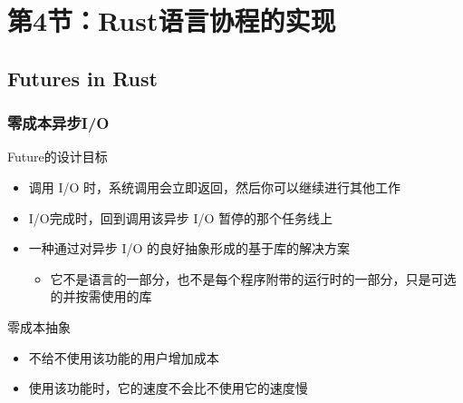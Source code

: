 \section{第4节：Rust语言协程的实现} %
\subsection{Futures in Rust}
% 
% 
\begin{frame}[fragile]
    \frametitle{零成本异步I/O}
% 
% 
% 
Future的设计目标

    \begin{itemize}
        \item 调用 I/O 时，系统调用会立即返回，然后你可以继续进行其他工作
        \item I/O完成时，回到调用该异步 I/O 暂停的那个任务线上
        \item {\color{red}一种通过对异步 I/O 的良好抽象形成的基于库的解决方案}
    	\begin{itemize}
    	    \item 它不是语言的一部分，也不是每个程序附带的运行时的一部分，只是可选的并按需使用的库
    	\end{itemize}
    \end{itemize}

{\color{red}零成本抽象}
% 
    \begin{itemize}
        \item 不给不使用该功能的用户增加成本
        \item 使用该功能时，它的速度不会比不使用它的速度慢
    \end{itemize}
% 
\end{frame}
